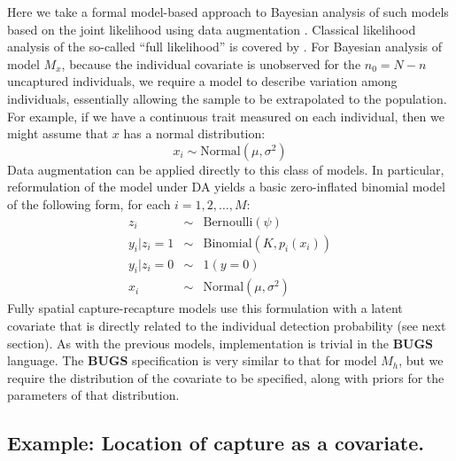 Here we take a formal model-based approach to Bayesian analysis of
such models based on the joint likelihood using data augmentation
\citep{royle:2009}. Classical likelihood analysis of the so-called
``full likelihood'' is covered by \citet{borchers_etal:2002}.  For
Bayesian analysis of model $M_{x}$, because the 
individual covariate is unobserved for the $n_{0} = N-n$ uncaptured
individuals, we require a model to describe variation among
individuals, essentially allowing the sample to be extrapolated to the
population.  For example, if we have a continuous trait measured on
each individual, then we might assume that $x$ has a normal distribution:
\[
x_{i} \sim \mbox{Normal}(\mu,\sigma^{2})
\]
Data augmentation can be applied directly to this class of models. In
particular, reformulation of the model under DA yields a basic
zero-inflated binomial model of the following form, for each
$i=1,2,\ldots, M$:
\begin{eqnarray*}
z_{i} &\sim& \mbox{Bernoulli}(\psi)  \\
y_{i}|{z_{i}\! =\! 1} &\sim& \mbox{Binomial}(K,p_{i}(x_{i})) \\
y_{i} |{ z_{i}\! =\! 0} &\sim& 1(y=0)  \\
x_{i} & \sim & \mbox{Normal}(\mu,\sigma^{2})
\end{eqnarray*}
Fully spatial capture-recapture models use this formulation with a
latent covariate that is directly related to the individual detection
probability (see next section). As with the previous models,
implementation is trivial in the {\bf BUGS} language. The {\bf BUGS}
specification is very similar to that for model $M_h$, but we require
the distribution of the covariate to be specified, along with priors
for the parameters of that distribution.


\subsection{Example: Location of capture as a covariate.}

